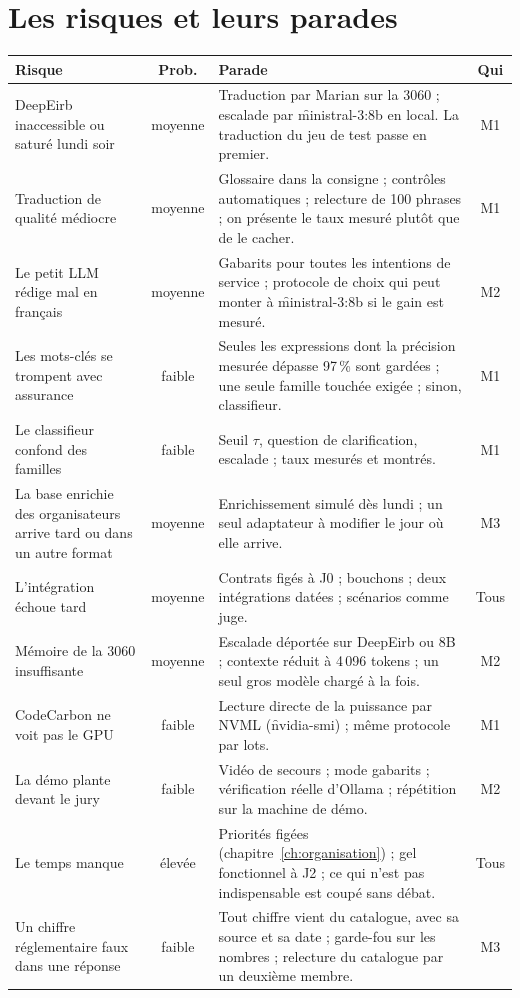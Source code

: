\chapter{Les risques et leurs parades}
\label{ch:risques}

\begin{center}\small
\begin{longtable}{@{}L{3.6cm} c L{7.2cm} c@{}}
\toprule
\textbf{Risque} & \textbf{Prob.} & \textbf{Parade} & \textbf{Qui} \\
\midrule
\endhead
DeepEirb inaccessible ou saturé lundi soir & moyenne & Traduction par Marian sur la 3060 ;
  escalade par \f{ministral-3:8b} en local. La traduction du jeu de test passe en premier. & M1 \\
\addlinespace
Traduction de qualité médiocre & moyenne & Glossaire dans la consigne ; contrôles automatiques ;
  relecture de 100 phrases ; on présente le taux mesuré plutôt que de le cacher. & M1 \\
\addlinespace
Le petit LLM rédige mal en français & moyenne & Gabarits pour toutes les intentions de service ;
  protocole de choix qui peut monter à \f{ministral-3:8b} si le gain est mesuré. & M2 \\
\addlinespace
Les mots-clés se trompent avec assurance & faible & Seules les expressions dont la précision
  mesurée dépasse 97\,\% sont gardées ; une seule famille touchée exigée ; sinon, classifieur. & M1 \\
\addlinespace
Le classifieur confond des familles & faible & Seuil $\tau$, question de clarification, escalade ;
  taux mesurés et montrés. & M1 \\
\addlinespace
La base enrichie des organisateurs arrive tard ou dans un autre format & moyenne & Enrichissement
  simulé dès lundi ; un seul adaptateur à modifier le jour où elle arrive. & M3 \\
\addlinespace
L'intégration échoue tard & moyenne & Contrats figés à J0 ; bouchons ; deux intégrations datées ;
  scénarios comme juge. & Tous \\
\addlinespace
Mémoire de la 3060 insuffisante & moyenne & Escalade déportée sur DeepEirb ou 8B ; contexte réduit
  à 4\,096 tokens ; un seul gros modèle chargé à la fois. & M2 \\
\addlinespace
CodeCarbon ne voit pas le GPU & faible & Lecture directe de la puissance par NVML
  (\f{nvidia-smi}) ; même protocole par lots. & M1 \\
\addlinespace
La démo plante devant le jury & faible & Vidéo de secours ; mode gabarits ; vérification réelle
  d'Ollama ; répétition sur la machine de démo. & M2 \\
\addlinespace
Le temps manque & élevée & Priorités figées (chapitre~\ref{ch:organisation}) ; gel fonctionnel à
  J2 ; ce qui n'est pas indispensable est coupé sans débat. & Tous \\
\addlinespace
Un chiffre réglementaire faux dans une réponse & faible & Tout chiffre vient du catalogue, avec sa
  source et sa date ; garde-fou sur les nombres ; relecture du catalogue par un deuxième membre. &
  M3 \\
\bottomrule
\end{longtable}
\end{center}

